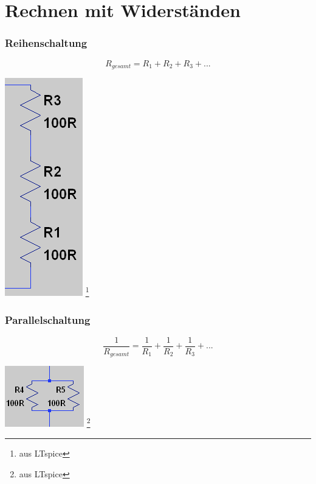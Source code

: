 \section{Rechnen mit Widerständen}

\begin{frame}
    \frametitle{Reihenschaltung}
        
    $$R_{gesamt} = R_1 + R_2 + R_3 + ...$$

	\begin{center}
        \includegraphics[width=.2\textwidth]{e04/Reihe.png}
        \footnote{\tiny aus LTspice}
    \end{center}
\end{frame}

\begin{frame}
    \frametitle{Parallelschaltung}
        $$\frac{1}{R_{gesamt}} = \frac{1}{R_1} + \frac{1}{R_2} + \frac{1}{R_3} + ...$$
        
	\begin{center}
        \includegraphics[width=.5\textwidth]{e04/Parallel.png}
        \footnote{\tiny aus LTspice}
    \end{center}
    

\end{frame}

